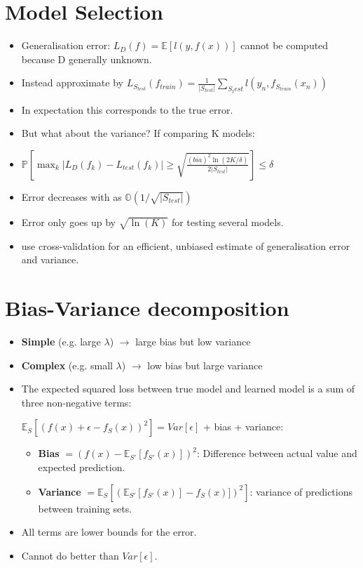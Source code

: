 \section{Model Selection}
\begin{itemize}
    \item Generalisation error: $L_D(f)=\mathbb{E}[l(y,f(x))]$ cannot be computed because D generally unknown.
    \item Instead approximate by  $L_{S_{test}}(f_{train}) = \frac{1}{\vert S_{test} \vert} \sum_{S_test} l(y_n, f_{S_{train}}(x_n))$
    \item In expectation this corresponds to the true error.
    \item But what about the variance? If comparing K models:
    \item $\mathbb{P}[\max_k\vert L_D(f_k) - L_{test}(f_k) \vert \geq \sqrt{\frac{(bia)^2\ln(2K/\delta)}{2\vert S_{test} \vert}}] \leq \delta$
    \item Error decreases with as $\mathbb{O}(1/\sqrt{\vert S_{test} \vert})$
    \item Error only goes up by $\sqrt{\ln(K)}$ for testing several models.
    \item use cross-validation for an efficient, unbiased estimate of generalisation error and variance.
\end{itemize}

\section{Bias-Variance decomposition}
\begin{itemize}
	\item {\bf Simple} (e.g. large  $\lambda$) $\rightarrow$ large bias but low variance
	\item {\bf Complex} (e.g. small  $\lambda$) $\rightarrow$ low bias but large variance
	\item The expected squared loss between true model and learned model is a sum of three non-negative terms:

	 	$\mathbb{E}_S[(f(x) + \epsilon - f_{S}(x))^2] = Var[\epsilon]$ + bias + variance:
	\begin{itemize}
	 	\item \textbf{Bias} $= (f(x) - \mathbb{E}_{S'}[f_{S'}(x)])^2$: Difference between actual value and expected prediction.
	 	\item \textbf{Variance} $= \mathbb{E}_S[(\mathbb{E}_{S'}[f_{S'}(x)] - f_S(x)])^2]$: variance of predictions between training sets.
	\end{itemize}
	
	\item All terms are lower bounds for the error.
	\item Cannot do better than $Var[\epsilon]$.
	
\end{itemize}

